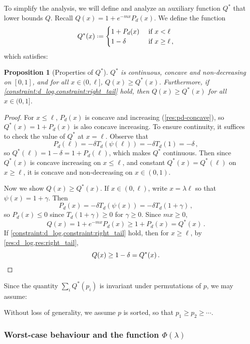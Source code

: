 \documentclass[10pt,a4paper]{article}
\newtheorem{proposition}{Proposition}[section]
\newcommand*{\define}{\mathrel{\vcenter{\baselineskip0.5ex \lineskiplimit0pt
                      \hbox{\scriptsize.}\hbox{\scriptsize.}}}%
                      =}
\begin{document}
To simplify the analysis, we will define and analyze an auxiliary function $Q^*$ that lower bounds
$Q$.
Recall $Q(x) = 1 + e^{-mx} P_d(x)$.  We define the function
\[
  Q^*(x) \define \begin{cases}
    1 + P_d(x) &\text{ if } x < \ell \\
    1 - \delta &\text{ if } x \geq \ell \,,
  \end{cases}
\]
which satisfies:
\begin{proposition}[Properties of $Q^*$]
\label{res:Q*-properties}
$Q^*$ is continuous, concave and non-decreasing on $[0,1]$, and for all $x \in (0,\ell]$, $Q(x) \geq
Q^*(x)$.  Furthermore, if \cref{constraint:d_log,constraint:right_tail} hold, then $Q(x) \geq
Q^*(x)$ for all $x \in (0,1]$.
\end{proposition}
\begin{proof}
For $x \leq \ell$, $P_d(x)$ is concave and increasing
(\cref{res:pd-concave}), so $Q^*(x) = 1 + P_d(x)$ is also concave increasing. To ensure continuity,
it suffices to check the value of $Q^*$ at $x=\ell$. Observe that
\[
P_d(\ell) = - \delta T_d(\psi(\ell)) = - \delta T_d(1) = - \delta \,,
\]
so $Q^*(\ell) = 1-\delta =
1 + P_d(\ell)$, which makes $Q^*$ continuous. Then since $Q^*(x)$ is concave increasing on $x \leq
\ell$, and constant $Q^*(x) = Q^*(\ell)$ on $x \geq \ell$, it is concave and non-decreasing on $x
\in (0,1)$.

Now we show $Q(x) \geq Q^*(x)$. If $x \in (0, \ell)$, write $x = \lambda \ell$ so that $\psi(x) = 1
+ \gamma$. Then
\[
  P_d(x) = - \delta T_d(\psi(x)) = -\delta T_d(1 + \gamma) \,,
\]
so $P_d(x) \leq 0$ since $T_d(1+\gamma) \geq 0$ for $\gamma \geq 0$. Since $mx \geq 0$,
\[
  Q(x) = 1 + e^{-mx} P_d(x) \geq 1 + P_d(x) = Q^*(x) \,.
\]
If \cref{constraint:d_log,constraint:right_tail} hold, then for $x \geq \ell$, by
\cref{res:d_log,res:right_tail},
\[
  Q(x) \geq 1 - \delta = Q^*(x) \,. \qedhere
\]
\end{proof}

Since the quantity $\sum_i Q^*(p_i)$ is invariant under permutations of $p$, we may assume:
\begin{assumption}
\label{assumption:sorted}
Without loss of generality, we assume $p$ is sorted, so that $p_1 \geq p_2 \geq \dotsm$.
\end{assumption}


\subsubsection{Worst-case behaviour and the function \texorpdfstring{$\Phi(\lambda)$}{Phi(lambda)}}
\label{section:better-bound-worst-case}
\end{document}
